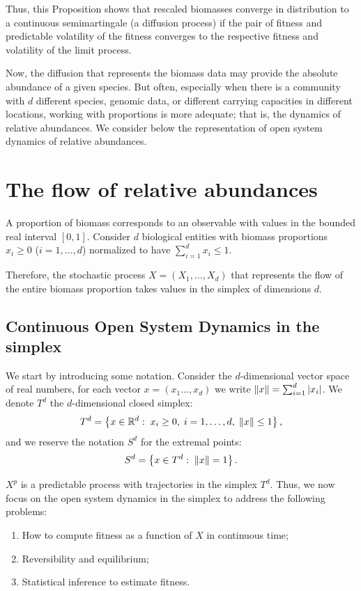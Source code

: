 \documentclass[12pt]{article}
\begin{document}
Thus, this Proposition shows that rescaled biomasses converge in distribution to a continuous semimartingale (a diffusion process) if the pair of fitness and predictable volatility of the fitness converges to the respective fitness and volatility of the limit process. 

Now, the diffusion that represents the biomass data may provide the absolute abundance of a given species. But often, especially when there is a community with $d$ different species, genomic data, or different carrying capacities in different locations, working with proportions is more adequate; that is, the dynamics of relative abundances. We consider below the representation of open system dynamics of relative abundances.

 \section{The flow of relative abundances}\label{sec:relative-abundance}
 A proportion of biomass corresponds to an observable with values in the bounded real interval $[0,1]$. Consider $d$ biological entities with biomass proportions $x_i\geq 0$ ($i=1,\ldots,d$) normalized to have $\sum_{i=1}^dx_i\leq 1$. 

Therefore, the stochastic process $X=(X_1,\ldots,X_d)$ that represents the flow of the entire biomass proportion takes values in the simplex of dimensions $d$.

\subsection{Continuous Open System Dynamics in the simplex}\label{sec:OSD-S}

We start by introducing some  notation. Consider the $d$-dimensional vector space of real numbers, for each vector $x=(x_1\ldots,x_d)$ we write $\left\Vert x\right\Vert=\sum_{i=1}^d\left\vert x_i\right\vert$. We denote $T^d$ the $d$-dimensional closed simplex:
\[T^d=\left\{x\in{\mathbb R}^{d}:\;x_i\geq 0,\;i=1,\ldots,d,\;\left\Vert x\right\Vert\leq 1\right\},\]
and we reserve the notation $S^d$ for the extremal points:
\[S^d=\left\{x\in T^d:\;\left\Vert x\right\Vert=1\right\}.\]

$X^p$ is a predictable process with trajectories in the simplex $T^d$. Thus, we now focus on the open system dynamics in the simplex to address the following problems: \begin{enumerate}
    \item How to compute fitness as a function of $X$ in continuous time;
    \item Reversibility and equilibrium;
    \item Statistical inference to estimate fitness.
\end{enumerate}
\end{document}
